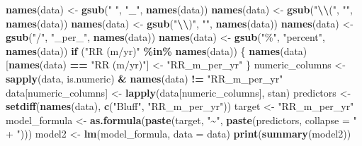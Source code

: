\documentclass[
]{article}
\newenvironment{Shaded}{\begin{snugshade}}{\end{snugshade}}
\newcommand{\AttributeTok}[1]{\textcolor[rgb]{0.13,0.29,0.53}{#1}}
\newcommand{\ControlFlowTok}[1]{\textcolor[rgb]{0.13,0.29,0.53}{\textbf{#1}}}
\newcommand{\FunctionTok}[1]{\textcolor[rgb]{0.13,0.29,0.53}{\textbf{#1}}}
\newcommand{\NormalTok}[1]{#1}
\newcommand{\OtherTok}[1]{\textcolor[rgb]{0.56,0.35,0.01}{#1}}
\newcommand{\SpecialCharTok}[1]{\textcolor[rgb]{0.81,0.36,0.00}{\textbf{#1}}}
\newcommand{\StringTok}[1]{\textcolor[rgb]{0.31,0.60,0.02}{#1}}
\begin{document}
\begin{Shaded}
\begin{Highlighting}[]
\FunctionTok{names}\NormalTok{(data) }\OtherTok{\textless{}{-}} \FunctionTok{gsub}\NormalTok{(}\StringTok{" "}\NormalTok{, }\StringTok{"\_"}\NormalTok{, }\FunctionTok{names}\NormalTok{(data))}
\FunctionTok{names}\NormalTok{(data) }\OtherTok{\textless{}{-}} \FunctionTok{gsub}\NormalTok{(}\StringTok{"}\SpecialCharTok{\textbackslash{}\textbackslash{}}\StringTok{("}\NormalTok{, }\StringTok{""}\NormalTok{, }\FunctionTok{names}\NormalTok{(data))}
\FunctionTok{names}\NormalTok{(data) }\OtherTok{\textless{}{-}} \FunctionTok{gsub}\NormalTok{(}\StringTok{"}\SpecialCharTok{\textbackslash{}\textbackslash{}}\StringTok{)"}\NormalTok{, }\StringTok{""}\NormalTok{, }\FunctionTok{names}\NormalTok{(data))}
\FunctionTok{names}\NormalTok{(data) }\OtherTok{\textless{}{-}} \FunctionTok{gsub}\NormalTok{(}\StringTok{"/"}\NormalTok{, }\StringTok{"\_per\_"}\NormalTok{, }\FunctionTok{names}\NormalTok{(data))}
\FunctionTok{names}\NormalTok{(data) }\OtherTok{\textless{}{-}} \FunctionTok{gsub}\NormalTok{(}\StringTok{"\%"}\NormalTok{, }\StringTok{"percent"}\NormalTok{, }\FunctionTok{names}\NormalTok{(data))}
\ControlFlowTok{if}\NormalTok{ (}\StringTok{"RR (m/yr)"} \SpecialCharTok{\%in\%} \FunctionTok{names}\NormalTok{(data)) \{}
  \FunctionTok{names}\NormalTok{(data)[}\FunctionTok{names}\NormalTok{(data) }\SpecialCharTok{==} \StringTok{"RR (m/yr)"}\NormalTok{] }\OtherTok{\textless{}{-}} \StringTok{"RR\_m\_per\_yr"}
\NormalTok{\}}
\NormalTok{numeric\_columns }\OtherTok{\textless{}{-}} \FunctionTok{sapply}\NormalTok{(data, is.numeric) }\SpecialCharTok{\&} \FunctionTok{names}\NormalTok{(data) }\SpecialCharTok{!=} \StringTok{"RR\_m\_per\_yr"}
\NormalTok{data[numeric\_columns] }\OtherTok{\textless{}{-}} \FunctionTok{lapply}\NormalTok{(data[numeric\_columns], stan)}
\NormalTok{predictors }\OtherTok{\textless{}{-}} \FunctionTok{setdiff}\NormalTok{(}\FunctionTok{names}\NormalTok{(data), }\FunctionTok{c}\NormalTok{(}\StringTok{"Bluff"}\NormalTok{, }\StringTok{"RR\_m\_per\_yr"}\NormalTok{))}
\NormalTok{target }\OtherTok{\textless{}{-}} \StringTok{"RR\_m\_per\_yr"}
\NormalTok{model\_formula }\OtherTok{\textless{}{-}} \FunctionTok{as.formula}\NormalTok{(}\FunctionTok{paste}\NormalTok{(target, }\StringTok{"\textasciitilde{}"}\NormalTok{, }\FunctionTok{paste}\NormalTok{(predictors, }\AttributeTok{collapse =} \StringTok{" + "}\NormalTok{)))}
\NormalTok{model2 }\OtherTok{\textless{}{-}} \FunctionTok{lm}\NormalTok{(model\_formula, }\AttributeTok{data =}\NormalTok{ data)}
\FunctionTok{print}\NormalTok{(}\FunctionTok{summary}\NormalTok{(model2))}
\end{Highlighting}
\end{Shaded}
\end{document}
